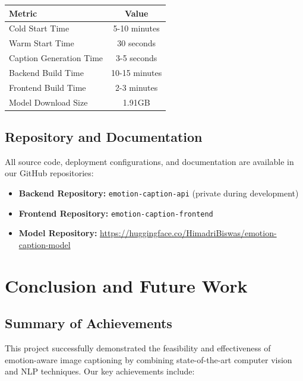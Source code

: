 \documentclass[12pt]{article}
\begin{document}
\begin{center}
\begin{tabular}{lc}
\toprule
\textbf{Metric} & \textbf{Value} \\
\midrule
Cold Start Time & 5-10 minutes \\
Warm Start Time & 30 seconds \\
Caption Generation Time & 3-5 seconds \\
Backend Build Time & 10-15 minutes \\
Frontend Build Time & 2-3 minutes \\
Model Download Size & 1.91GB \\
\bottomrule
\end{tabular}
\end{center}

\subsection{Repository and Documentation}

All source code, deployment configurations, and documentation are available in our GitHub repositories:

\begin{itemize}
\item \textbf{Backend Repository:} \texttt{emotion-caption-api} (private during development)
\item \textbf{Frontend Repository:} \texttt{emotion-caption-frontend}
\item \textbf{Model Repository:} \url{https://huggingface.co/HimadriBiswas/emotion-caption-model}
\end{itemize}

\section{Conclusion and Future Work}

\subsection{Summary of Achievements}

This project successfully demonstrated the feasibility and effectiveness of emotion-aware image captioning by combining state-of-the-art computer vision and NLP techniques. Our key achievements include:
\end{document}
